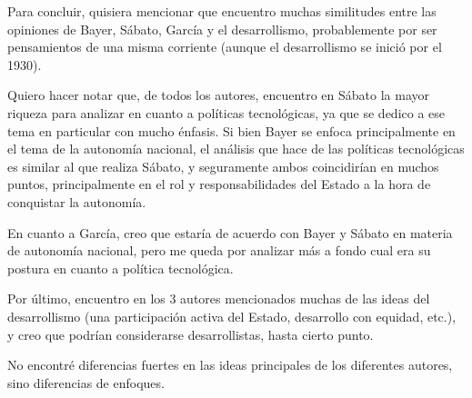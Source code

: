 Para concluir, quisiera mencionar que encuentro muchas similitudes entre las opiniones de Bayer, Sábato, García y el desarrollismo,
probablemente por ser pensamientos de una misma corriente (aunque el desarrollismo se inició por el 1930).

Quiero hacer notar que, de todos los autores, encuentro en Sábato la mayor riqueza para analizar en cuanto a políticas tecnológicas, ya que se dedico a ese tema en particular con mucho énfasis. Si bien Bayer se enfoca principalmente en el tema de la autonomía nacional, el análisis que hace de las políticas tecnológicas es similar al que realiza Sábato, y seguramente ambos coincidirían en muchos puntos, principalmente en el rol y responsabilidades del Estado a la hora de conquistar la autonomía.

En cuanto a García, creo que estaría de acuerdo con Bayer y Sábato en materia de autonomía nacional, pero me queda por analizar más a fondo cual era su postura en cuanto a política tecnológica.

Por último, encuentro en los 3 autores mencionados muchas de las ideas del desarrollismo (una participación activa del Estado, desarrollo con equidad, etc.), y creo que podrían considerarse desarrollistas, hasta cierto punto.

No encontré diferencias fuertes en las ideas principales de los diferentes autores, sino diferencias de enfoques.
